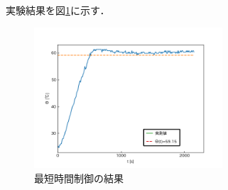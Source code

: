 \documentclass[12pt]{jsarticle}
\begin{document}
実験結果を図\ref{Control_Exp}に示す．
\begin{figure}[tb]
  \begin{center}
    \includegraphics[clip,width=7.0cm]{../graph/Control_Exp.png}
    \caption{最短時間制御の結果}
    \label{Control_Exp}
  \end{center}
\end{figure}
\end{document}
